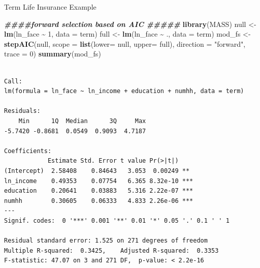 \documentclass[
  ignorenonframetext,
]{beamer}
\newenvironment{Shaded}{\begin{snugshade}}{\end{snugshade}}
\newcommand{\AttributeTok}[1]{\textcolor[rgb]{0.13,0.29,0.53}{#1}}
\newcommand{\DecValTok}[1]{\textcolor[rgb]{0.00,0.00,0.81}{#1}}
\newcommand{\DocumentationTok}[1]{\textcolor[rgb]{0.56,0.35,0.01}{\textbf{\textit{#1}}}}
\newcommand{\FunctionTok}[1]{\textcolor[rgb]{0.13,0.29,0.53}{\textbf{#1}}}
\newcommand{\NormalTok}[1]{#1}
\newcommand{\OtherTok}[1]{\textcolor[rgb]{0.56,0.35,0.01}{#1}}
\newcommand{\SpecialCharTok}[1]{\textcolor[rgb]{0.81,0.36,0.00}{\textbf{#1}}}
\newcommand{\StringTok}[1]{\textcolor[rgb]{0.31,0.60,0.02}{#1}}
\begin{document}
\begin{frame}[fragile]{Term Life Insurance Example}
\label{term-life-insurance-example-5}
\tiny

\begin{Shaded}
\begin{Highlighting}[]
\DocumentationTok{\#\#\#\#forward selection based on AIC \#\#\#\#\#}
\FunctionTok{library}\NormalTok{(MASS)}
\NormalTok{null }\OtherTok{\textless{}{-}} \FunctionTok{lm}\NormalTok{(ln\_face  }\SpecialCharTok{\textasciitilde{}} \DecValTok{1}\NormalTok{, }\AttributeTok{data =}\NormalTok{ term)}
\NormalTok{full }\OtherTok{\textless{}{-}} \FunctionTok{lm}\NormalTok{(ln\_face }\SpecialCharTok{\textasciitilde{}}\NormalTok{ ., }\AttributeTok{data =}\NormalTok{ term)}
\NormalTok{mod\_fs }\OtherTok{\textless{}{-}} \FunctionTok{stepAIC}\NormalTok{(null, }\AttributeTok{scope =} \FunctionTok{list}\NormalTok{(}\AttributeTok{lower=}\NormalTok{ null, }\AttributeTok{upper=}\NormalTok{ full), }
                  \AttributeTok{direction =} \StringTok{"forward"}\NormalTok{, }\AttributeTok{trace =} \DecValTok{0}\NormalTok{)}
\FunctionTok{summary}\NormalTok{(mod\_fs)}
\end{Highlighting}
\end{Shaded}

\begin{verbatim}

Call:
lm(formula = ln_face ~ ln_income + education + numhh, data = term)

Residuals:
    Min      1Q  Median      3Q     Max 
-5.7420 -0.8681  0.0549  0.9093  4.7187 

Coefficients:
            Estimate Std. Error t value Pr(>|t|)    
(Intercept)  2.58408    0.84643   3.053  0.00249 ** 
ln_income    0.49353    0.07754   6.365 8.32e-10 ***
education    0.20641    0.03883   5.316 2.22e-07 ***
numhh        0.30605    0.06333   4.833 2.26e-06 ***
---
Signif. codes:  0 '***' 0.001 '**' 0.01 '*' 0.05 '.' 0.1 ' ' 1

Residual standard error: 1.525 on 271 degrees of freedom
Multiple R-squared:  0.3425,    Adjusted R-squared:  0.3353 
F-statistic: 47.07 on 3 and 271 DF,  p-value: < 2.2e-16
\end{verbatim}

\normalsize
\end{frame}
\end{document}
